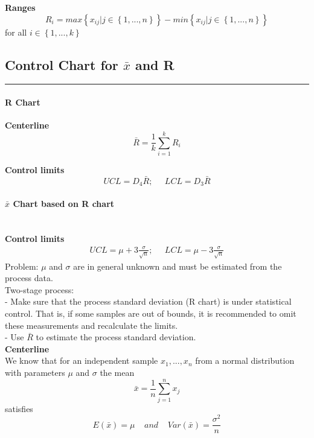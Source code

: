 \textbf{Ranges}
\begin{equation}
  R_i = max\left \{x_{ij} | j \in \left \{1,...,n\right \} \right \} - min\left \{x_{ij} | j \in \left \{1,...,n\right \} \right \}
\end{equation}
for all $i \in \left \{1,...,k\right \}$

\subsection{Control Chart for $\bar{x}$ and R}
\noindent\rule[\linienAbstand]{\linewidth}{\linienDicke}
\paragraph{R Chart}\mbox{}
\textbf{Centerline}
\begin{equation}
  \bar{R} = \frac{1}{k} \sum^k_{i=1} R_i
\end{equation}

\textbf{Control limits}
\begin{equation}
    UCL = D_4 \bar{R}; \;\;\;\;\; LCL = D_3 \bar{R}
\end{equation}

\paragraph{$\bar{x}$ Chart based on R chart}\mbox{}\\
\textbf{Control limits}
\begin{equation}
  \begin{split}
    UCL = \mu + 3 \frac{\sigma}{\sqrt{n}}; \;\;\;\;\; LCL = \mu - 3 \frac{\sigma}{\sqrt{n}}
  \end{split}
\end{equation}
Problem: $\mu$ and $\sigma$ are in general unknown and must be estimated from the process data.\\
Two-stage process:\\
 - Make sure that the process standard deviation (R chart) is under statistical control. That is, if some samples are out of bounds, it is recommended
to omit these measurements and recalculate the limits.\\
 - Use $\bar{R}$ to estimate the process standard deviation.\\

\textbf{Centerline}\\
We know that for an independent sample $x_1, ... ,x_n$ from a normal distribution with parameters $\mu$ and $\sigma$ the mean
\begin{equation}
  \bar{x} = \frac{1}{n} \sum_{j=1}^n x_{j}
\end{equation}
satisfies
\begin{equation}
  E\left(\bar{x}\right) = \mu \;\;\;\; and \;\;\;\; Var\left(\bar{x}\right) = \frac{\sigma^2}{n}
\end{equation}


